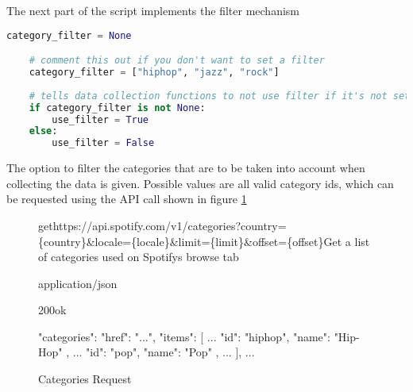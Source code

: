 The next part of the script implements the filter mechanism

\begin{lstlisting}[language=Python]
    category_filter = None

    # comment this out if you don't want to set a filter
    category_filter = ["hiphop", "jazz", "rock"]
    
    # tells data collection functions to not use filter if it's not set
    if category_filter is not None:
        use_filter = True
    else:
        use_filter = False
\end{lstlisting} 

The option to filter the categories that are to be taken into account when collecting the data is given.
Possible values are all valid category ids, which can be requested using the API call shown in figure \ref{fig:Categories Request}

\begin{figure}[H]
    \caption{Categories Request}
	\label{fig:Categories Request}
\begin{apiRoute}{get}{https://api.spotify.com/v1/categories?country=\{country\}\&locale=\{locale\}\&limit=\{limit\}\&offset=\{offset\}}{Get a list of categories used on Spotifys browse tab}
    \begin{routeParameter}
    \end{routeParameter}
    \begin{routeResponse}{application/json}
        \begin{routeResponseItem}{200}{ok}
            \begin{routeResponseItemBody}
{
  "categories": {
    "href": "...",
    "items": [
      {
        ...
        "id": "hiphop",
        "name": "Hip-Hop"
        },
        {
          ...
          "id": "pop",
          "name": "Pop"
        },
        ...
    ],
    ...
  }
}
            \end{routeResponseItemBody}
        \end{routeResponseItem}
    \end{routeResponse}
\end{apiRoute}
\end{figure}

